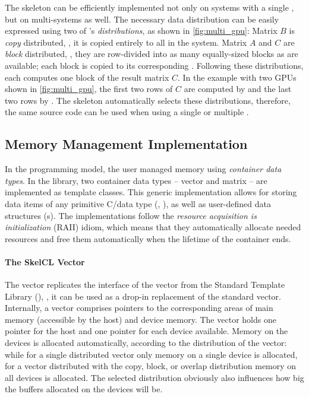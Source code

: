 The \allpairs skeleton can be efficiently implemented not only on systems with a single \GPU, but on multi-\GPU systems as well.
The necessary data distribution can be easily expressed using two of \SkelCL's \emph{distributions}, as shown in \autoref{fig:multi_gpu}:
Matrix $B$ is \emph{copy} distributed, \ie, it is copied entirely to all \GPUs in the system.
Matrix $A$ and $C$ are \emph{block} distributed, \ie, they are row-divided into as many equally-sized blocks as \GPUs are available;
each block is copied to its corresponding \GPU.
Following these distributions, each \GPU computes one block of the result matrix $C$.
In the example with two GPUs shown in \autoref{fig:multi_gpu}, the first two rows of $C$ are computed by  and the last two rows by .
The \allpairs skeleton automatically selects these distributions, therefore, the same source code can be used when using a single \GPU or multiple \GPUs.











\subsection{Memory Management Implementation}
\label{section:skelcl-library:memory-management}
In the \SkelCL programming model, the user managed memory using \emph{container data types}.
In the \SkelCL library, two container data types -- vector and matrix -- are implemented as template classes.
This generic implementation allows for storing data items of any primitive C/\Cpp data type (\eg, ), as well as user-defined data structures (s).
The implementations follow the \emph{resource acquisition is initialization} (RAII) idiom, which means that they automatically allocate needed resources and free them automatically when the lifetime of the container ends.

\paragraph{The SkelCL Vector}
The \SkelCL vector replicates the interface of the vector from the \Cpp Standard Template Library (\STL), \ie, it can be used as a drop-in replacement of the standard vector.
Internally, a vector comprises pointers to the corresponding areas of main memory (accessible by the host) and device memory.
The vector holds one pointer for the host and one pointer for each device available.
Memory on the devices is allocated automatically, according to the distribution of the vector:
while for a single distributed vector only memory on a single device is allocated, for a vector distributed with the copy, block, or overlap distribution memory on all devices is allocated.
The selected distribution obviously also influences how big the buffers allocated on the devices will be.

